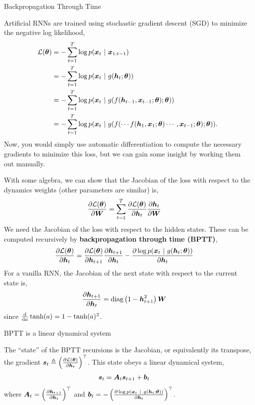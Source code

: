 \documentclass[aspectratio=169]{beamer}
\begin{document}
\begin{frame}[t,allowframebreaks]{Backpropagation Through
Time}\label{backpropagation-through-time}

Artificial RNNs are trained using stochastic gradient descent (SGD) to
minimize the negative log likelihood, 
\begin{align*}
\mathcal{L}(\boldsymbol{\theta})
&= - \sum_{t=1}^T \log p(\boldsymbol{x}_t ~\vert~ \boldsymbol{x}_{1:t-1}) \\
&= - \sum_{t=1}^T \log p(\boldsymbol{x}_t ~\vert~ g(\boldsymbol{h}_t; \boldsymbol{\theta})) \\
&= - \sum_{t=1}^T \log p(\boldsymbol{x}_t ~\vert~ g(f(\boldsymbol{h}_{t-1}, \boldsymbol{x}_{t-1}; \boldsymbol{\theta}); \boldsymbol{\theta})) \\
&= - \sum_{t=1}^T \log p(\boldsymbol{x}_t ~\vert~ g(f(\cdots f(\boldsymbol{h}_{1}, \boldsymbol{x}_{1}; \boldsymbol{\theta}) \cdots, \boldsymbol{x}_{t-1}; \boldsymbol{\theta}); \boldsymbol{\theta})).
\end{align*} 
Now, you would simply use automatic differentiation to
compute the necessary gradients to minimize this loss, but we can gain
some insight by working them out manually. 

With some algebra, we can
show that the Jacobian of the loss with respect to the dynamics weights
(other parameters are similar) is, 
\begin{align*}
\frac{\partial \mathcal{L}(\boldsymbol{\theta})}{\partial \boldsymbol{W}} &= \sum_{t=1}^T \frac{\partial \mathcal{L}(\boldsymbol{\theta})}{\partial \boldsymbol{h}_t} \frac{ \partial \boldsymbol{h}_t}{\partial \boldsymbol{W}}
\end{align*} 
We need the Jacobian of the loss with respect to the hidden
states. These can be computed recursively by \textbf{backpropagation
through time (BPTT)}, 
\begin{align*}
\frac{\partial \mathcal{L}(\boldsymbol{\theta})}{\partial \boldsymbol{h}_t} 
&= \frac{\partial \mathcal{L}(\boldsymbol{\theta})}{\partial \boldsymbol{h}_{t+1}} \frac{\partial \boldsymbol{h}_{t+1}}{\partial \boldsymbol{h}_t} - \frac{\partial \log p(\boldsymbol{x}_t ~\vert~ g(\boldsymbol{h}_t; \boldsymbol{\theta}))}{\partial \boldsymbol{h}_t}
\end{align*} 
For a vanilla RNN, the Jacobian of the next state with
respect to the current state is, \begin{align*}
\frac{\partial \boldsymbol{h}_{t+1}}{\partial \boldsymbol{h}_t} 
&= \textrm{diag} \left(1 - \boldsymbol{h}_{t+1}^2 \right) \boldsymbol{W}
\end{align*} since \(\frac{\mathop{}\!\mathrm{d}}{\mathop{}\!\mathrm{d} a}\tanh(a) = 1 - \tanh(a)^2\).

\end{frame}

\begin{frame}[t,allowframebreaks]{BPTT is a linear dynamical system} 
    
The ``state'' of the BPTT recursions is the Jacobian, or equivalently its transpose, the
gradient
\(\boldsymbol{s}_t \triangleq \left(\frac{\partial \mathcal{L}(\boldsymbol{\theta})}{\partial \boldsymbol{h}_t}\right)^\top\).
This state obeys a linear dynamical system, \begin{align*}
\boldsymbol{s}_t &= \boldsymbol{A}_t \boldsymbol{s}_{t+1} + \boldsymbol{b}_t
\end{align*} where
\(\boldsymbol{A}_t = \left(\frac{\partial \boldsymbol{h}_{t+1}}{\partial \boldsymbol{h}_t} \right)^\top\)
and
\(\boldsymbol{b}_t = - \left(\frac{\partial \log p(\boldsymbol{x}_t ~\vert~ g(\boldsymbol{h}_t; \boldsymbol{\theta}))}{\partial \boldsymbol{h}_t} \right)^\top\).
\end{frame}
\end{document}
